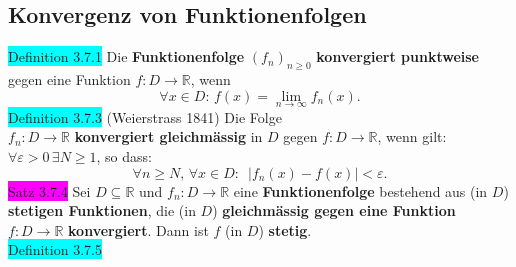 \documentclass[landscape, 10pt]{article}
\newcommand{\R}{\mathbb{R}}
\begin{document}
\begin{multicols}{3}
       \subsection{Konvergenz von Funktionenfolgen}
              \colorbox{cyan}{Definition 3.7.1} 
                     Die \textbf{Funktionenfolge} 
                     \textcolor{NavyBlue}{$(f_n)_{n\geqslant0}$}
                     \textbf{konvergiert punktweise} 
                     gegen eine Funktion
                     \textcolor{NavyBlue}{
                     $f:D\longrightarrow\R$}, wenn 
                     \begin{equation*}
                            \forall x\in D:\,
                            f(x)
                            =\lim\limits_{n\to\infty}f_n(x).
                     \end{equation*}
              \colorbox{cyan}{Definition 3.7.3} 
              (Weierstrass 1841) 
                     Die Folge \\
                     \textcolor{NavyBlue}{$f_n:D\longrightarrow\R$} 
                     \textbf{konvergiert gleichmässig} in 
                     \textcolor{NavyBlue}{$D$} gegen 
                     \textcolor{NavyBlue}{$f:D\longrightarrow\R$}, 
                     wenn gilt: 
                     \textcolor{NavyBlue}{
                     $\forall\varepsilon>0\,\exists N\geqslant1$}, 
                     so dass: 
                     \begin{equation*}
                            \forall n\geqslant N,\,
                            \forall x\in D:\enspace 
                            |f_n(x)-f(x)|<\varepsilon.
                     \end{equation*}
              \colorbox{magenta}{Satz 3.7.4} 
                     Sei \textcolor{NavyBlue}{$D\subseteq\R$} und 
                     \textcolor{NavyBlue}{$f_n:D\longrightarrow\R$} 
                     eine \textbf{Funktionenfolge} bestehend aus 
                     (in \textcolor{NavyBlue}{$D$}) 
                     \textbf{stetigen Funktionen}, die 
                     (in \textcolor{NavyBlue}{$D$}) 
                     \textbf{gleichmässig gegen eine 
                     Funktion} \textcolor{NavyBlue}{
                     $f:D\longrightarrow\R$} 
                     \textbf{konvergiert}. 
                     Dann ist \textcolor{NavyBlue}{$f$}
                     (in \textcolor{NavyBlue}{$D$}) 
                     \textbf{stetig}.\\
              \colorbox{cyan}{Definition 3.7.5} 

\end{multicols}
\end{document}
